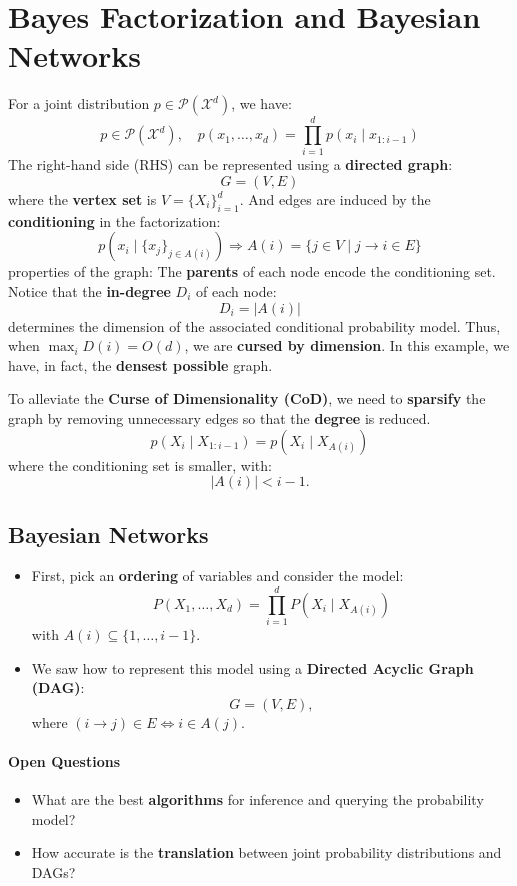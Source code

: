 \documentclass{article}%
\begin{document}
\section{Bayes Factorization and Bayesian Networks}
For a joint distribution \( p \in \mathcal{P}(\mathcal{X}^d) \), we have:
\[
p \in \mathcal{P}(\mathcal{X}^d), \quad p(x_1, \dots, x_d) = \prod_{i=1}^{d} p(x_i \mid x_{1:i-1})
\]
The right-hand side (RHS) can be represented using a \textbf{directed graph}:
\[
G = (V, E)
\]
where the \textbf{vertex set} is \( V = \{X_i\}_{i=1}^{d} \). And edges are induced by the \textbf{conditioning} in the factorization:
\[
p(x_i \mid \{x_j\}_{j \in A(i)}) \Rightarrow A(i) = \{ j \in V \mid j \to i \in E \}
\]
properties of the graph: The \textbf{parents} of each node encode the conditioning set. Notice that the \textbf{in-degree} \( D_i \) of each node:
\[
D_i = | A(i) |
\]
determines the dimension of the associated conditional probability model. Thus, when \( \max_i D(i) = O(d) \), we are \textbf{cursed by dimension}. In this example, we have, in fact, the \textbf{densest possible} graph.

To alleviate the \textbf{Curse of Dimensionality (CoD)}, we need to \textbf{sparsify} the graph by removing unnecessary edges so that the \textbf{degree} is reduced.
\[
p(X_i \mid X_{1:i-1}) = p(X_i \mid X_{A(i)})
\]
where the conditioning set is smaller, with:
\[
|A(i)| < i - 1.
\]

\subsection{Bayesian Networks}

\begin{itemize}
    \item First, pick an \textbf{ordering} of variables and consider the model:
          \[
          P(X_1, \dots, X_d) = \prod_{i=1}^{d} P(X_i \mid X_{A(i)})
          \]
          with \( A(i) \subseteq \{1, \dots, i-1\} \).
    \item We saw how to represent this model using a \textbf{Directed Acyclic Graph (DAG)}:
          \[
          G = (V, E),
          \]
          where \( (i \to j) \in E \iff i \in A(j) \).
\end{itemize}

\paragraph{Open Questions}
\begin{itemize}
    \item What are the best \textbf{algorithms} for inference and querying the probability model?
    \item How accurate is the \textbf{translation} between joint probability distributions and DAGs?
\end{itemize}
\end{document}
